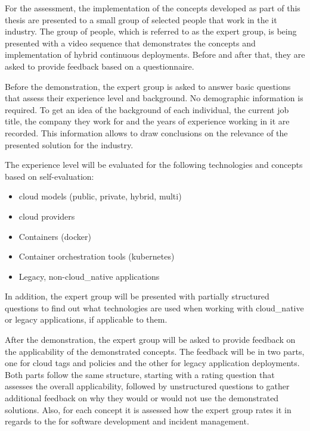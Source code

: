 \documentclass[../main.tex]{subfiles}
\begin{document}
    For the assessment, the implementation of the concepts developed as part of this thesis are presented to a small group of selected people that work in the \acrshort{it} industry.
    The group of people, which is referred to as the expert group, is being presented with a video sequence that demonstrates the concepts and implementation of hybrid continuous deployments.
    Before and after that, they are asked to provide feedback based on a questionnaire.

    Before the demonstration, the expert group is asked to answer basic questions that assess their experience level and background.
    No demographic information is required.
    To get an idea of the background of each individual, the current job title, the company they work for and the years of experience working in \acrshort{it} are recorded.
    This information allows to draw conclusions on the relevance of the presented solution for the industry.

    The experience level will be evaluated for the following technologies and concepts based on self-evaluation:
    \begin{itemize}
        \setlength\itemsep{0em}
        \item \Gls{cloud} models (public, private, hybrid, multi)
        \item \Gls{cloud} providers
        \item Containers (\gls{docker})
        \item Container orchestration tools (\gls{kubernetes})
        \item Legacy, non-\gls{cloud_native} applications
    \end{itemize}

    In addition, the expert group will be presented with partially structured questions to find out what technologies are used when working with \gls{cloud_native} or legacy applications, if applicable to them.

    After the demonstration, the expert group will be asked to provide feedback on the applicability of the demonstrated concepts.
    The feedback will be in two parts, one for \gls{cloud} tags and policies and the other for legacy application deployments.
    Both parts follow the same structure, starting with a rating question that assesses the overall applicability, followed by unstructured questions to gather additional feedback on why they would or would not use the demonstrated solutions.
    Also, for each concept it is assessed how the expert group rates it in regards to the  for software development and incident management.
\end{document}
